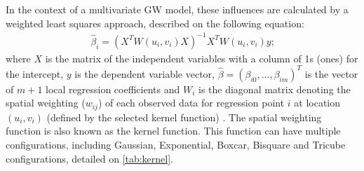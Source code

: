 In the context of a multivariate GW model, these influences are calculated by a weighted least squares approach, described on the following equation: \begin{align}
    \hat{\beta}_i = (X^T W(u_i,v_i)X)^{-1} X^T W(u_i, v_i)y \mbox{;}
    \label{eq:wls}
\end{align} where $X$ is the matrix of the independent variables with a column of 1s (ones) for the intercept, $y$ is the dependent variable vector, $\hat{\beta} = (\beta_{i0},...,\beta_{im})^T$ is the vector of $m + 1$ local regression coefficients and $W_i$ is the diagonal matrix denoting the spatial weighting ($w_{ij}$) of each observed data for regression point $i$ at location $(u_i, v_i)$ (defined by the selected kernel function) \cite{Gollini2013}. The spatial weighting function is also known as the kernel function. This function can have multiple configurations, including Gaussian, Exponential, Boxcar, Bisquare and Tricube configurations, detailed on \autoref{tab:kernel}.

